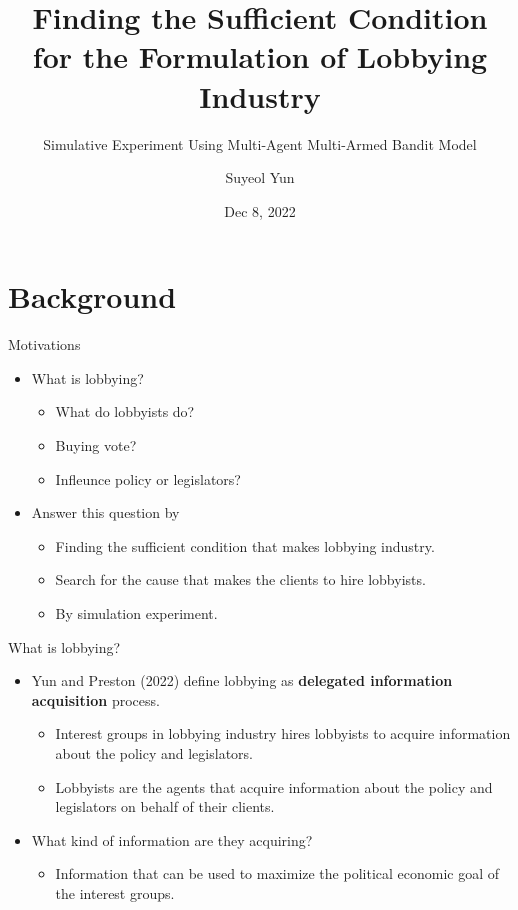 \documentclass{beamer}
\begin{document}
	\title[]{Finding the Sufficient Condition for the Formulation of Lobbying Industry}
	\subtitle{Simulative Experiment Using Multi-Agent Multi-Armed Bandit Model}
	\author[Suyeol Yun]{Suyeol Yun}
	\date{Dec 8, 2022}
	\frame{\titlepage}
	\section{Background}

	\begin{frame}{Motivations}
		\begin{itemize}
			\item What is lobbying?
			\begin{itemize}
				\item What do lobbyists do?
				\item Buying vote? 
				\item Infleunce policy or legislators?
			\end{itemize}
		\end{itemize}
		\begin{itemize}
			\item Answer this question by
			\begin{itemize}
				\item Finding the sufficient condition that makes lobbying industry. 
				\item Search for the cause that makes the clients to hire lobbyists.
				\item By simulation experiment.				
			\end{itemize}
		\end{itemize}
	\end{frame}

	\begin{frame}{What is lobbying?}
		\begin{itemize}
			\item Yun and Preston (2022) define lobbying as \textbf{delegated information acquisition} process.
			\begin{itemize}
				\item Interest groups in lobbying industry hires lobbyists to acquire information about the policy and legislators.
				\item Lobbyists are the agents that acquire information about the policy and legislators on behalf of their clients.		
			\end{itemize}
			\item What kind of information are they acquiring?
			\begin{itemize}
				\item Information that can be used to maximize the political economic goal of the interest groups.
			\end{itemize}
		\end{itemize}
	\end{frame}
\end{document}
